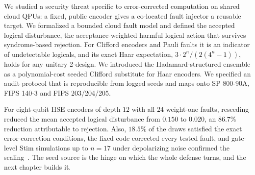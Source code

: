 We studied a security threat specific to error-corrected computation on shared cloud QPUs: a fixed, public encoder gives a co-located fault injector a reusable target. We formalized a bounded cloud fault model and defined the accepted logical disturbance, the acceptance-weighted harmful logical action that survives syndrome-based rejection. For Clifford encoders and Pauli faults it is an indicator of undetectable logicals, and its exact Haar expectation, $3\cdot 2^{n}/(2(4^{n}-1))$, holds for any unitary 2-design. We introduced the Hadamard-structured ensemble as a polynomial-cost seeded Clifford substitute for Haar encoders. We specified an audit protocol that is reproducible from logged seeds and maps onto SP 800-90A, FIPS 140-3 and FIPS 203/204/205.

For eight-qubit HSE encoders of depth $12$ with all $24$ weight-one faults, reseeding reduced the mean accepted logical disturbance from $0.150$ to $0.020$, an $86.7\%$ reduction attributable to rejection. Also, $18.5\%$ of the draws satisfied the exact error-correction conditions, the fixed  code corrected every tested fault, and gate-level Stim simulations up to $n=17$ under depolarizing noise confirmed the scaling~\cite{guo2026qecaudit}. The seed source is the hinge on which the whole defense turns, and the next chapter builds it.
